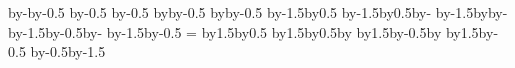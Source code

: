 {{    \centerpoint\advance\pgf@x by-\pgfutil@tempdimc\advance\pgf@y by-0.5\pgfutil@tempdimd\pgfpathcircle{\pgfpoint{\pgf@x}{\pgf@y}}{\pgfutil@tempdimb}
    \centerpoint\advance\pgf@y by-0.5\pgfutil@tempdimd\pgfpathcircle{\pgfpoint{\pgf@x}{\pgf@y}}{\pgfutil@tempdima}
    \centerpoint\advance\pgf@y by-0.5\pgfutil@tempdimd\pgfpathcircle{\pgfpoint{\pgf@x}{\pgf@y}}{\pgfutil@tempdimb}
    \centerpoint\advance\pgf@x by\pgfutil@tempdimc\advance\pgf@y by-0.5\pgfutil@tempdimd\pgfpathcircle{\pgfpoint{\pgf@x}{\pgf@y}}{\pgfutil@tempdima}
    \centerpoint\advance\pgf@x by\pgfutil@tempdimc\advance\pgf@y by-0.5\pgfutil@tempdimd\pgfpathcircle{\pgfpoint{\pgf@x}{\pgf@y}}{\pgfutil@tempdimb}
    \color{gray}
    \pgfsetlinewidth{2\pgflinewidth}
    \centerpoint\advance\pgf@x by-1.5\pgfutil@tempdimc\advance\pgf@y by0.5\pgfutil@tempdimd\pgfpathmoveto{\pgfpoint{\pgf@x}{\pgf@y}}
    \centerpoint\advance\pgf@x by-1.5\pgfutil@tempdimc\advance\pgf@y by0.5\pgfutil@tempdimd\advance\pgf@x by-\pgfutil@tempdime\pgfpathlineto{\pgfpoint{\pgf@x}{\pgf@y}}
    \centerpoint\advance\pgf@x by-1.5\pgfutil@tempdimc\advance\pgf@y by\pgfutil@tempdimf\advance\pgf@x by-\pgfutil@tempdime\pgfpathlineto{\pgfpoint{\pgf@x}{\pgf@y}}
    \centerpoint\advance\pgf@x by-1.5\pgfutil@tempdimc\advance\pgf@y by-0.5\pgfutil@tempdimd\advance\pgf@x by-\pgfutil@tempdime\pgfpathlineto{\pgfpoint{\pgf@x}{\pgf@y}}
    \centerpoint\advance\pgf@x by-1.5\pgfutil@tempdimc\advance\pgf@y by-0.5\pgfutil@tempdimd\pgfpathlineto{\pgfpoint{\pgf@x}{\pgf@y}}
    \pgfutil@tempdime=\tactright
    \centerpoint\advance\pgf@x by1.5\pgfutil@tempdimc\advance\pgf@y by0.5\pgfutil@tempdimd\pgfpathmoveto{\pgfpoint{\pgf@x}{\pgf@y}}
    \centerpoint\advance\pgf@x by1.5\pgfutil@tempdimc\advance\pgf@y by0.5\pgfutil@tempdimd\advance\pgf@x by\pgfutil@tempdime\pgfpathlineto{\pgfpoint{\pgf@x}{\pgf@y}}
    \centerpoint\advance\pgf@x by1.5\pgfutil@tempdimc\advance\pgf@y by-0.5\pgfutil@tempdimd\advance\pgf@x by\pgfutil@tempdime\pgfpathlineto{\pgfpoint{\pgf@x}{\pgf@y}}
    \centerpoint\advance\pgf@x by1.5\pgfutil@tempdimc\advance\pgf@y by-0.5\pgfutil@tempdimd\pgfpathlineto{\pgfpoint{\pgf@x}{\pgf@y}}
    \color{black}
    \begingroup
    \tikzset{pcb/part labels} %
    \tikz@textfont
    \centerpoint\advance\pgf@y by-0.5\pgfutil@tempdimd\advance\pgf@y by-1.5\pgfutil@tempdimb
    \endgroup
  }
}
